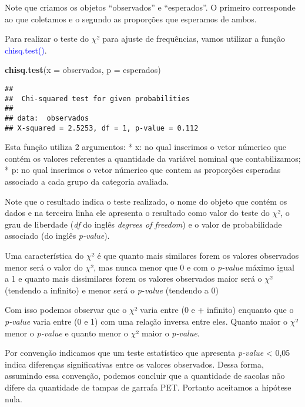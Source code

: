 \documentclass[14pt,titlepage, oneside, openany, a4paper]{book}
\newenvironment{Shaded}{\begin{snugshade}}{\end{snugshade}}
\newcommand{\DataTypeTok}[1]{\textcolor[rgb]{0.13,0.29,0.53}{#1}}
\newcommand{\KeywordTok}[1]{\textcolor[rgb]{0.13,0.29,0.53}{\textbf{#1}}}
\newcommand{\NormalTok}[1]{#1}
\begin{document}
Note que criamos os objetos ``observados'' e ``esperados''. O primeiro corresponde ao que coletamos e o segundo as proporções que esperamos de ambos.

Para realizar o teste do \(\chi\)² para ajuste de frequências, vamos utilizar a função \textcolor{blue}{chisq.test()}.

\begin{Shaded}
\begin{Highlighting}[]
\KeywordTok{chisq.test}\NormalTok{(}\DataTypeTok{x =}\NormalTok{ observados, }\DataTypeTok{p =}\NormalTok{ esperados)}
\end{Highlighting}
\end{Shaded}

\begin{verbatim}
## 
##  Chi-squared test for given probabilities
## 
## data:  observados
## X-squared = 2.5253, df = 1, p-value = 0.112
\end{verbatim}

Esta função utiliza 2 argumentos:
* x: no qual inserimos o vetor númerico que contém os valores referentes a quantidade da variável nominal que contabilizamos;
* p: no qual inserimos o vetor númerico que contem as proporções esperadas associado a cada grupo da categoria avaliada.

Note que o resultado indica o teste realizado, o nome do objeto que contém os dados e na terceira linha ele apresenta o resultado como valor do teste do \(\chi\)², o grau de liberdade (\emph{df} do inglês \emph{degrees of freedom}) e o valor de probabilidade associado (do inglês \emph{p-value}).

Uma característica do \(\chi\)² é que quanto mais similares forem os valores observados menor será o valor do \(\chi\)², mas nunca menor que 0 e com o \emph{p-value} máximo igual a 1 e quanto mais dissimilares forem os valores observados maior será o \(\chi\)² (tendendo a infinito) e menor será o \emph{p-value} (tendendo a 0)

Com isso podemos observar que o \(\chi\)² varia entre (0 e + infinito) enquanto que o \emph{p-value} varia entre (0 e 1) com uma relação inversa entre eles. Quanto maior o \(\chi\)² menor o \emph{p-value} e quanto menor o \(\chi\)² maior o \emph{p-value}.

Por convenção indicamos que um teste estatístico que apresenta \emph{p-value} \textless{} 0,05 indica diferenças significativas entre os valores observados. Dessa forma, assumindo essa convenção, podemos concluir que a quantidade de sacolas não difere da quantidade de tampas de garrafa PET. Portanto aceitamos a hipótese nula.
\end{document}
